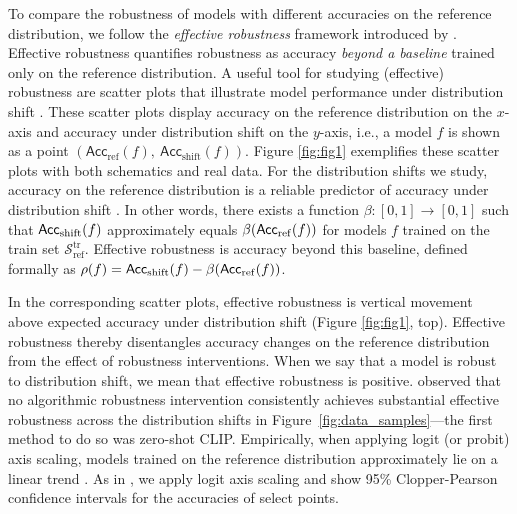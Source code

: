 To compare the robustness of models with different accuracies on the reference distribution, we follow the \emph{effective robustness} framework introduced by \citet{taori2020measuring}.
Effective robustness quantifies robustness as accuracy \emph{beyond a baseline} trained only on the reference distribution.
A useful tool for studying (effective) robustness are scatter plots that illustrate model performance under distribution shift  \cite{pmlr-v97-recht19a, taori2020measuring}. 
These scatter plots display accuracy on the reference distribution on the $x$-axis and accuracy under distribution shift on the $y$-axis, i.e., a model $f$ is shown as a point $\left(\mathsf{Acc}_{\mathrm{ref}}(f),\ \mathsf{Acc}_{\mathrm{shift}}(f)\right)$.
Figure \ref{fig:fig1} exemplifies these scatter plots with both schematics and real data.
For the distribution shifts we study, accuracy on the reference distribution is a reliable predictor of accuracy under distribution shift \cite{taori2020measuring, miller21b}. 
In other words, there exists a function $\beta : [0,1] \rightarrow [0,1]$ such that $\mathsf{Acc}_\mathrm{shift}\mleft(f\mright)$ approximately equals $\beta\mleft(\mathsf{Acc}_\mathrm{ref}\mleft(f\mright)\mright)$ for models $f$ trained on the train set $\mathcal{S}^\text{tr}_\mathrm{ref}$.  
Effective robustness \cite{taori2020measuring} is accuracy beyond this baseline, defined formally as $\rho(f) = \mathsf{Acc}_\mathrm{shift}(f) -\beta\mleft(\mathsf{Acc}_\mathrm{ref}\mleft(f\mright)\mright)$. 


In the corresponding scatter plots, effective robustness is vertical movement above expected accuracy under distribution shift (Figure \ref{fig:fig1}, top).
Effective robustness thereby disentangles accuracy changes on the reference distribution from the effect of robustness interventions.
When we say that a model is robust to distribution shift, we mean that effective robustness is positive. \citet{taori2020measuring} observed that no algorithmic robustness intervention consistently achieves substantial effective robustness across the distribution shifts in Figure~\ref{fig:data_samples}---the first method to do so was zero-shot CLIP.
Empirically, when applying logit (or probit) axis scaling, models trained on the reference distribution approximately lie on a linear trend \cite{taori2020measuring,miller21b}. As in \citet{taori2020measuring}, we apply logit axis scaling and show 95\% Clopper-Pearson confidence intervals for the accuracies of select points.



